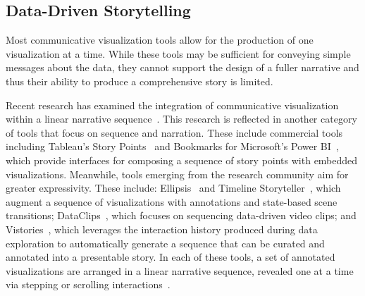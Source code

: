 \subsection{Data-Driven Storytelling}

Most communicative visualization tools allow for the production of one visualization at a time. While these tools may be sufficient for conveying simple messages about the data, they cannot support the design of a fuller narrative and thus their ability to produce a comprehensive story is limited.

Recent research has examined the integration of communicative visualization within a linear narrative sequence~\cite{hullman2013deeper}.  
This research is reflected in another category of tools that focus on sequence and narration. 
These include commercial tools including Tableau's Story Points~\cite{storypoints} and Bookmarks for Microsoft's Power BI~\cite{PowerBI}, which provide interfaces for composing a sequence of story points with embedded visualizations. 
Meanwhile, tools emerging from the research community aim for greater expressivity. These include: Ellipsis~\cite{satyanarayan2014authoring} and Timeline Storyteller~\cite{TimelineStoryteller}, which augment a sequence of visualizations with annotations and state-based scene transitions; DataClips~\cite{amini2017authoring}, which focuses on sequencing data-driven video clips; and Vistories~\cite{gratzl2016visual}, which leverages the interaction history produced during data exploration to automatically generate a sequence that can be curated and annotated into a presentable story. 
In each of these tools, a set of annotated visualizations are arranged in a linear narrative sequence, revealed one at a time via stepping or scrolling interactions~\cite{mckenna2017visual}.

